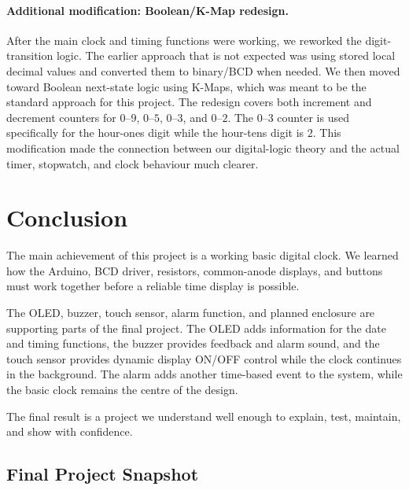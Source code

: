 \documentclass[12pt,letterpaper]{article}
\begin{document}
\paragraph{Additional modification: Boolean/K-Map redesign.}
After the main clock and timing functions were working, we reworked the
digit-transition logic. The earlier approach that is not expected was using stored local decimal values and
converted them to binary/BCD when needed. We then moved toward Boolean
next-state logic using K-Maps, which was meant to be the standard approach for this project. The redesign covers both increment and
decrement counters for \(0\)--\(9\), \(0\)--\(5\), \(0\)--\(3\), and
\(0\)--\(2\). The \(0\)--\(3\) counter is used specifically for the
hour-ones digit while the hour-tens digit is \(2\). This modification made
the connection between our digital-logic theory and the actual timer,
stopwatch, and clock behaviour much clearer.

\clearpage
\section{Conclusion}

The main achievement of this project is a working basic
digital clock. We learned how the Arduino, BCD driver,
resistors, common-anode displays, and buttons must work
together before a reliable time display is possible.

The OLED, buzzer, touch sensor, alarm function, and planned enclosure
are supporting parts of the final project. The OLED adds information for
the date and timing functions, the buzzer provides feedback and alarm
sound, and the touch sensor provides dynamic display ON/OFF control while
the clock continues in the background. The alarm adds another time-based
event to the system, while the basic clock remains the centre of the design.

The final result is a project we understand well enough to
explain, test, maintain, and show with confidence.

\subsection{Final Project Snapshot}
\end{document}
